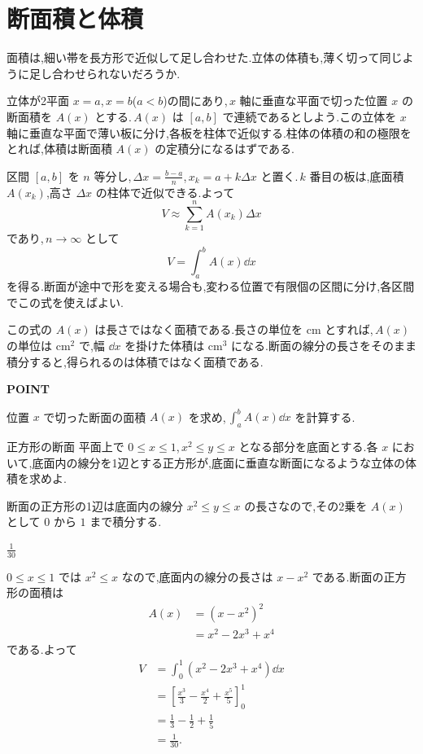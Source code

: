 \section{断面積と体積}\label{節:断面積と体積}

面積は,細い帯を長方形で近似して足し合わせた.立体の体積も,薄く切って同じように足し合わせられないだろうか.

立体が2平面 $x=a$,\,$x=b$($a<b$)の間にあり,\,$x$ 軸に垂直な平面で切った位置 $x$ の断面積を $A(x)$ とする.\,$A(x)$ は $[a,b]$ で連続であるとしよう.この立体を $x$ 軸に垂直な平面で薄い板に分け,各板を柱体で近似する.柱体の体積の和の極限をとれば,体積は断面積 $A(x)$ の定積分になるはずである.

区間 $[a,b]$ を $n$ 等分し,\,$\Delta x=\frac{b-a}{n}$,\,$x_k=a+k\Delta x$ と置く.\,$k$ 番目の板は,底面積 $A(x_k)$,高さ $\Delta x$ の柱体で近似できる.よって
\[
V\approx\sum_{k=1}^n A(x_k)\Delta x
\]
であり,\,$n\to\infty$ として
\begin{equation}\label{式:断面積の体積}
V=\int_a^b A(x)\dd x
\end{equation}
を得る.断面が途中で形を変える場合も,変わる位置で有限個の区間に分け,各区間でこの式を使えばよい.

この式の $A(x)$ は長さではなく面積である.長さの単位を $\mathrm{cm}$ とすれば,\,$A(x)$ の単位は $\mathrm{cm}^2$ で,幅 $\dd x$ を掛けた体積は $\mathrm{cm}^3$ になる.断面の線分の長さをそのまま積分すると,得られるのは体積ではなく面積である.

\begin{bookpoint}
\textbf{POINT}\par
位置 $x$ で切った断面の面積 $A(x)$ を求め,\,$\int_a^b A(x)\dd x$ を計算する.
\end{bookpoint}

\begin{example}{正方形の断面}
平面上で $0\le x\le1$,\,$x^2\le y\le x$ となる部分を底面とする.各 $x$ において,底面内の線分を1辺とする正方形が,底面に垂直な断面になるような立体の体積を求めよ.
\end{example}

断面の正方形の1辺は底面内の線分 $x^2\le y\le x$ の長さなので,その2乗を $A(x)$ として $0$ から $1$ まで積分する.

$\frac1{30}$

$0\le x\le1$ では $x^2\le x$ なので,底面内の線分の長さは $x-x^2$ である.断面の正方形の面積は
\begin{align*}
A(x)&=(x-x^2)^2\\
 &=x^2-2x^3+x^4
\end{align*}
である.よって
\begin{align*}
V&=\int_0^1(x^2-2x^3+x^4)\dd x\\
 &=\left[\frac{x^3}{3}-\frac{x^4}{2}+\frac{x^5}{5}\right]_0^1\\
 &=\frac13-\frac12+\frac15\\
 &=\frac1{30}.
\end{align*}

